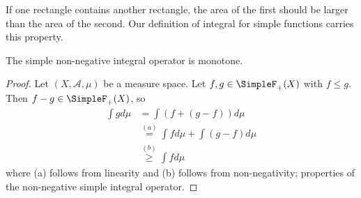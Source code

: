 

If one rectangle contains another rectangle, the area of the first should be larger than the area of the second.
Our definition of integral for simple functions carries this property.


\begin{prop}

The simple non-negative
integral operator
is monotone.

\begin{proof}

Let $(X, \mathcal{A}, \mu)$
be a measure space.
  Let $f, g \in \SimpleF_+(X)$
with $f \leq g$.
Then $f - g \in \SimpleF_+(X)$,
so
\[
  \begin{aligned}
    \int g d\mu &= \int (f + (g - f)) d\mu \\
                &\overset{(a)}{=} \int f d\mu + \int (g - f) d\mu \\
                &\overset{(b)}{\geq} \int f d \mu
  \end{aligned}
\]
where (a) follows from
linearity
and (b) follows from
non-negativity; properties
of the non-negative simple
integral operator.

\end{proof}

\end{prop}
